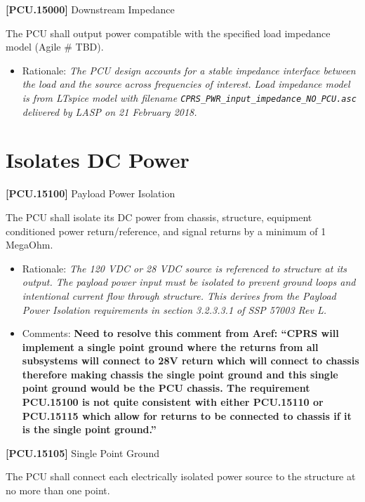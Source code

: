 \documentclass[12pt,oneside,oldfontcommands]{memoir}
\begin{document}
\textbf{[PCU.15000]} Downstream Impedance

The \gls{PCU} shall output power compatible with the specified load impedance model (Agile \# TBD\label{tbx_10}).

\begin{itemize}
\item{} Rationale: \emph{The PCU design accounts for a stable impedance interface between the load and the source across frequencies of interest. Load impedance model is from LTspice model with filename \texttt{CPRS\_PWR\_input\_impedance\_NO\_PCU.asc} delivered by LASP on 21 February 2018.}

\end{itemize}

\section{Isolates DC Power}
\label{isolatesdcpower}

\textbf{[PCU.15100]} Payload Power Isolation

The \gls{PCU} shall isolate its DC power from chassis, structure, equipment conditioned power return\slash reference, and signal returns by a minimum of 1 MegaOhm.

\begin{itemize}
\item{} Rationale: \emph{The 120 VDC or 28 VDC source is referenced to structure at its output. The payload power input must be isolated to prevent ground loops and intentional current flow through structure. This derives from the Payload Power Isolation requirements in section 3.2.3.3.1 of SSP 57003 Rev L.}

\item{} Comments: \textbf{Need to resolve this comment from Aref: ``CPRS will implement a single point ground where the returns from all subsystems will connect to 28V return which will connect to chassis therefore making chassis the single point ground and this single point ground would be the PCU chassis. The requirement PCU.15100 is not quite consistent with either PCU.15110 or PCU.15115 which allow for returns to be connected to chassis if it is the single point ground.''}

\end{itemize}

\textbf{[PCU.15105]} Single Point Ground

The \gls{PCU} shall connect each electrically isolated power source to the structure at no more than one point.
\end{document}
